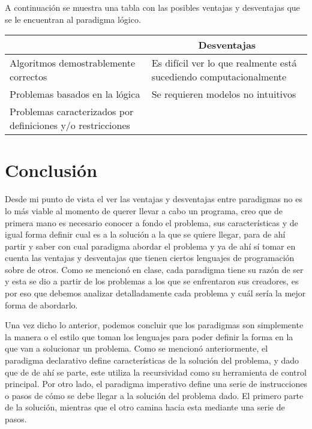 \documentclass[12pt, oneside]{article}
\begin{document}
A continuación se muestra una tabla con las posibles ventajas y desventajas que se le encuentran al paradigma lógico.

\begin{table}[H]
\centering
\renewcommand{\arraystretch}{1.5}
	\begin{tabular}{| p{7cm} | p{7cm}|}
		\hline
		\rowcolor{lightgray}
		\multicolumn{1}{|c|}{{\bf Ventajas}} & \multicolumn{1}{|c|}{{\bf Desventajas}} \\
		\hline
		Algoritmos demostrablemente correctos& Es difícil ver lo que realmente está sucediendo computacionalmente \\
		\hline
		Problemas basados en la lógica & Se requieren modelos no intuitivos \\
		\hline
		Problemas caracterizados por definiciones y/o restricciones &  \\
		\hline
	\end{tabular}
\renewcommand{\arraystretch}{1}
\end{table}

\section*{Conclusión}

Desde mi punto de vista el ver las ventajas y desventajas entre paradigmas no es lo más viable al momento de querer llevar a cabo un programa, creo que de primera mano es necesario conocer a fondo el problema, sus características y de igual forma definir cual es a la solución a la que se quiere llegar, para de ahí partir y saber con cual paradigma abordar el problema y ya de ahí sí tomar en cuenta las ventajas y desventajas que tienen ciertos lenguajes de programación sobre de otros. Como se mencionó en clase, cada paradigma tiene su razón de ser y esta se dio a partir de los problemas a los que se enfrentaron sus creadores, es por eso que debemos analizar detalladamente cada problema y cuál sería la mejor forma de abordarlo.

Una vez dicho lo anterior, podemos concluir que los paradigmas son simplemente la manera o el estilo que toman los lenguajes para poder definir la forma en la que van a solucionar un problema. Como se mencionó anteriormente, el paradigma declarativo define características de la solución del problema, y dado que de de ahí se parte, este utiliza la recursividad como su herramienta de control principal. Por otro lado, el paradigma imperativo define una serie de instrucciones o pasos de cómo se debe llegar a la solución del problema dado. El primero parte de la solución, mientras que el otro camina hacia esta mediante una serie de pasos.





\end{document}
